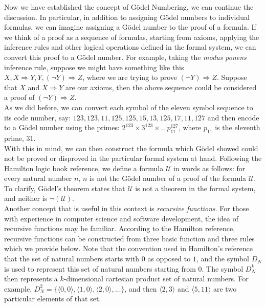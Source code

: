 Now we have established the concept of G\"odel Numbering, we can continue the discussion.  In particular, in addition to assigning G\"odel numbers to individual formulas, we can imagine assigning a G\"odel number to the proof of a formula.  If we think of a proof as a sequence of formulas, starting from axioms, applying the inference rules and other logical operations defined in the formal system, we can convert this proof to a G\"odel number.  For example, taking the \textit{modus ponens} inference rule, suppose we might have something like this $X,X\Longrightarrow Y, Y,( \neg Y) \Longrightarrow Z$, where we are trying to prove $(\neg Y) \Longrightarrow Z$.  Suppose that $X$ and $X \Longrightarrow Y$ are our axioms, then the above sequence could be considered a proof of $(\neg Y) \Longrightarrow Z$.\\
As we did before, we can convert each symbol of the eleven symbol sequence to its code number, say: $123,123,11,125,125, 15,13,125,17,11,127$ and then encode to a G\"odel number using the primes: $2^{123} \times 3^{123} \times \ldots p_{11}^{127}$, where $p_{11}$ is the eleventh prime, $31$.\\

With this in mind, we can then construct the formula which G\"odel showed could not be proved or disproved in the particular formal system at hand.  Following the Hamilton logic book reference, we define a formula $\mathcal{U}$ in words as follows:  for every natural number $n$, $n$ is not the G\"odel number of a proof of the formula $\mathcal{U}$.  To clarify, G\"odel's theorem states that $\mathcal{U}$ is not a theorem in the formal system, and neither is $\neg (\mathcal{U})$.\\

Another concept that is useful in this context is \textit{recursive functions}.  For those with experience in computer science and software development, the idea of recursive functions may be familiar.  According to the Hamilton reference, recursive functions can be constructed from three basic function and three rules which we provide below.  Note that the convention used in Hamilton's reference that the set of natural numbers starts with $0$ as opposed to $1$, and the symbol $D_{N}$ is used to represent this set of natural numbers starting from $0$.  The symbol $D_{N}^{k}$ then represents a $k$-dimensional cartesian product set of natural numbers.  For example, $D_{N}^{2}=\{\langle 0,0 \rangle, \langle 1,0\rangle, \langle 2, 0 \rangle, \ldots \}$, and then $\langle 2,3 \rangle$ and $\langle 5,11 \rangle$ are two particular elements of that set.\\

